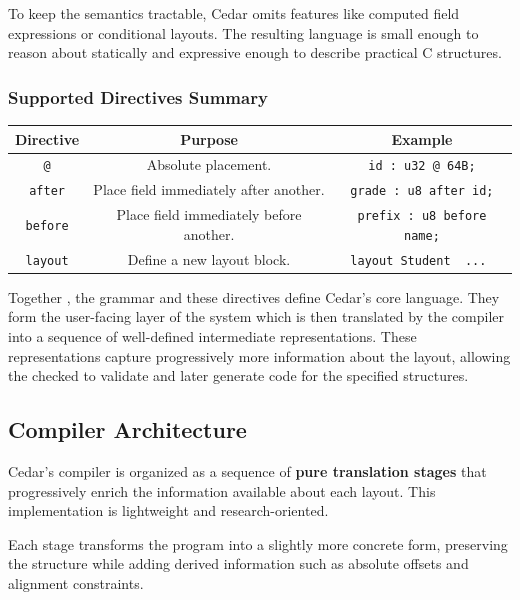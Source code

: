 To keep the semantics tractable, Cedar omits features like computed
field expressions or conditional layouts.
The resulting language is small enough to reason about statically and
expressive enough to describe practical C structures.

\subsubsection{Supported Directives Summary}
\begin{center}
    \begin{tabular}{|| c c c||}
        \hline
        Directive & Purpose & Example \\ [0.5ex]
        \hline\hline
        \texttt{@} & Absolute placement.  & \texttt{id : u32 @ 64B;} \\
        \hline
        \texttt{after} & Place field immediately after another. & \texttt{grade : u8 after id;} \\
        \hline
        \texttt{before} & Place field immediately before another. & \texttt{prefix : u8 before name;} \\
        \hline
        \texttt{layout} & Define a new layout block. & \texttt{layout Student { ... }} \\
        \hline
    \end{tabular}
\end{center}

Together , the grammar and these directives define Cedar's core language.
They form the user-facing layer of the system which is then translated by
the compiler into a sequence of well-defined intermediate representations.
These representations capture progressively more information
about the layout, allowing the checked to validate and later generate code
for the specified structures.

\subsection{Compiler Architecture}


Cedar's compiler is organized as a sequence of \textbf{pure translation stages}
that progressively enrich the information available about each layout.
This implementation is lightweight and research-oriented.


Each stage transforms the program into a slightly more concrete form,
preserving the structure while adding derived information such as absolute
offsets and alignment constraints.

